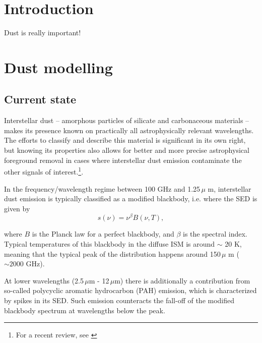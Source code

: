 \documentclass{aa}
\begin{document}
   \maketitle

\setcounter{tocdepth}{2}
\tableofcontents
   
\section{Introduction}
Dust is really important!

\clearpage
\section{Dust modelling}
\subsection{Current state}
Interstellar dust -- amorphous particles of silicate and carbonaceous materials -- makes its presence known on practically all astrophysically relevant wavelengths. The efforts to classify and describe this material is significant in its own right, but knowing its properties also allows for better and more precise astrophysical foreground removal in cases where interstellar dust emission contaminate the other signals of interest.\footnote{For a recent review, see \cite{Hensley2022}}.

In the frequency/wavelength regime between 100 GHz and 1.25\,$\mu$ m, interstellar dust emission is typically classified as a modified blackbody, i.e. where the SED is given by 
\begin{equation}
s(\nu) = \nu^\beta B(\nu, T),
\label{eq:mbb}
\end{equation}

where $B$ is the Planck law for a perfect blackbody, and $\beta$ is the spectral index. Typical temperatures of this blackbody in the diffuse ISM is around $\sim$ 20 K, meaning that the typical peak of the distribution happens around 150\,$\mu$ m ($\sim 2000$ GHz).

At lower wavelengths (2.5\,$\mu$m - 12\,$\mu$m) there is additionally a contribution from so-called polycyclic aromatic hydrocarbon (PAH) emission, which is characterized by spikes in its SED. Such emission counteracts the fall-off of the modified blackbody spectrum at wavelengths below the peak.
\end{document}
